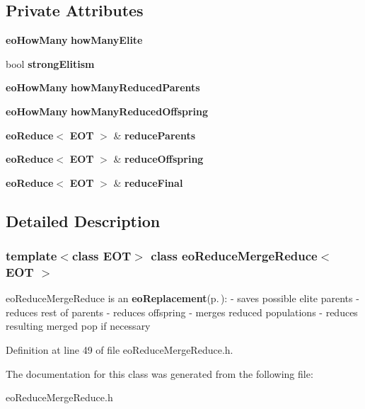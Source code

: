 \subsection*{Private Attributes}
\begin{CompactItemize}
\item 
{\bf eo\-How\-Many} {\bf how\-Many\-Elite}\label{classeo_reduce_merge_reduce_r0}

\item 
bool {\bf strong\-Elitism}\label{classeo_reduce_merge_reduce_r1}

\item 
{\bf eo\-How\-Many} {\bf how\-Many\-Reduced\-Parents}\label{classeo_reduce_merge_reduce_r2}

\item 
{\bf eo\-How\-Many} {\bf how\-Many\-Reduced\-Offspring}\label{classeo_reduce_merge_reduce_r3}

\item 
{\bf eo\-Reduce}$<$ {\bf EOT} $>$ \& {\bf reduce\-Parents}\label{classeo_reduce_merge_reduce_r4}

\item 
{\bf eo\-Reduce}$<$ {\bf EOT} $>$ \& {\bf reduce\-Offspring}\label{classeo_reduce_merge_reduce_r5}

\item 
{\bf eo\-Reduce}$<$ {\bf EOT} $>$ \& {\bf reduce\-Final}\label{classeo_reduce_merge_reduce_r6}

\end{CompactItemize}


\subsection{Detailed Description}
\subsubsection*{template$<$class EOT$>$ class eo\-Reduce\-Merge\-Reduce$<$ EOT $>$}

eo\-Reduce\-Merge\-Reduce is an {\bf eo\-Replacement}{\rm (p.\,\pageref{classeo_replacement})}: - saves possible elite parents - reduces rest of parents - reduces offspring - merges reduced populations - reduces resulting merged pop if necessary 



Definition at line 49 of file eo\-Reduce\-Merge\-Reduce.h.

The documentation for this class was generated from the following file:\begin{CompactItemize}
\item 
eo\-Reduce\-Merge\-Reduce.h\end{CompactItemize}

